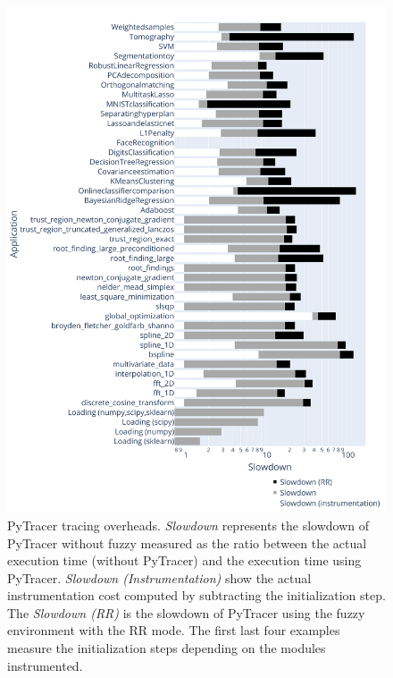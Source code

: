 \documentclass[10pt,journal,compsoc]{IEEEtran}
\newcommand{\pytracer}[0]{PyTracer\xspace}
\DeclareRobustCommand{\add}[1]{#1}
\DeclareRobustCommand{\remove}[1]{}
\begin{document}
\begin{figure}
    \centering
    \includegraphics[width=\linewidth]{figure/performance.pdf}
    \caption{
        \pytracer tracing overheads. \textit{Slowdown} represents the slowdown
        of \pytracer without fuzzy measured as the ratio between the actual
        execution time (without \pytracer) and the execution time using
        \pytracer. \textit{Slowdown (Instrumentation)} show the actual
        instrumentation cost computed by subtracting the initialization step.
        The \textit{Slowdown (RR)} \remove{and \textit{Slowdown (MCA)} are} \add{is} the slowdown
        of \pytracer using the fuzzy environment with \add{the} RR \remove{and Full MCA} mode\remove{s}. The
        first \remove{first} \add{last} four examples measure the initialization
        steps depending on the modules instrumented. 
    }
    \label{fig:performance_tracing}
\end{figure}
\end{document}

